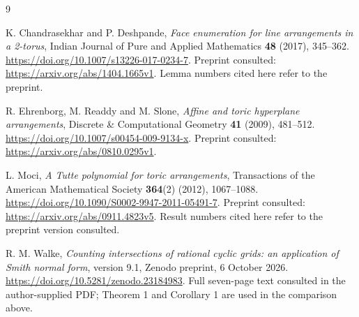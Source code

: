\documentclass[a4paper,11pt]{article}
\begin{document}
\begin{thebibliography}{9}
\raggedright
{}
K. Chandrasekhar and P. Deshpande,
\emph{Face enumeration for line arrangements in a 2-torus},
Indian Journal of Pure and Applied Mathematics \textbf{48} (2017), 345--362.
\url{https://doi.org/10.1007/s13226-017-0234-7}.
Preprint consulted: \url{https://arxiv.org/abs/1404.1665v1}.
Lemma numbers cited here refer to the preprint.

R. Ehrenborg, M. Readdy and M. Slone,
\emph{Affine and toric hyperplane arrangements},
Discrete \& Computational Geometry \textbf{41} (2009), 481--512.
\url{https://doi.org/10.1007/s00454-009-9134-x}.
Preprint consulted: \url{https://arxiv.org/abs/0810.0295v1}.

L. Moci,
\emph{A Tutte polynomial for toric arrangements},
Transactions of the American Mathematical Society \textbf{364}(2)
(2012), 1067--1088.
\url{https://doi.org/10.1090/S0002-9947-2011-05491-7}.
Preprint consulted: \url{https://arxiv.org/abs/0911.4823v5}.
Result numbers cited here refer to the preprint version consulted.

R. M. Walke,
\emph{Counting intersections of rational cyclic grids: an application
of Smith normal form}, version 9.1, Zenodo preprint, 6 October 2026.
\url{https://doi.org/10.5281/zenodo.23184983}.
Full seven-page text consulted in the author-supplied PDF;
Theorem 1 and Corollary 1 are used in the comparison above.
\end{thebibliography}
\end{document}
